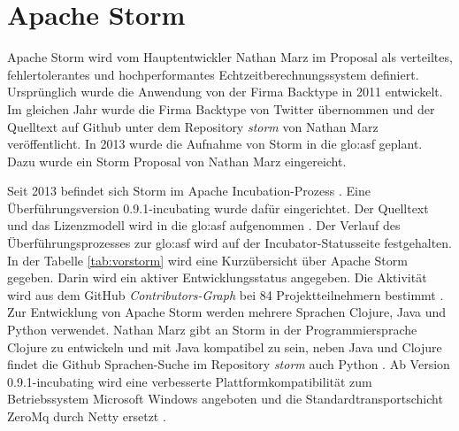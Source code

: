 \section{Apache Storm}
\label{section:storm}

Apache Storm wird vom Hauptentwickler Nathan Marz im Proposal als verteiltes, fehlertolerantes und hochperformantes Echtzeitberechnungssystem definiert. Ursprünglich wurde die Anwendung von der Firma Backtype in 2011 entwickelt. Im gleichen Jahr wurde die Firma Backtype von Twitter übernommen und der Quelltext auf Github  unter dem Repository \textit{storm}  von Nathan Marz veröffentlicht. In 2013 wurde die Aufnahme von Storm in die \gls{glo:asf} geplant. Dazu wurde ein Storm Proposal von Nathan Marz eingereicht.  

Seit 2013 befindet sich Storm im Apache Incubation-Prozess . Eine Überführungsversion 0.9.1-incubating wurde dafür eingerichtet. Der Quelltext und das Lizenzmodell wird in die \gls{glo:asf} aufgenommen . Der Verlauf des Überführungsprozesses zur \gls{glo:asf} wird auf der Incubator-Statusseite  festgehalten. In der Tabelle \ref{tab:vorstorm} wird eine Kurzübersicht über Apache Storm gegeben. Darin wird ein aktiver Entwicklungsstatus angegeben. Die Aktivität wird aus dem GitHub \textit{Contributors-Graph} bei 84 Projektteilnehmern bestimmt . Zur Entwicklung von Apache Storm werden mehrere Sprachen Clojure, Java und Python verwendet. Nathan Marz gibt an Storm in der Programmiersprache Clojure  zu entwickeln und mit Java   kompatibel zu sein, neben Java und Clojure  findet die Github Sprachen-Suche  im Repository \textit{storm} auch Python . Ab Version 0.9.1-incubating wird eine verbesserte Plattformkompatibilität zum Betriebssystem Microsoft Windows angeboten und die Standardtransportschicht ZeroMq  durch Netty  ersetzt .

